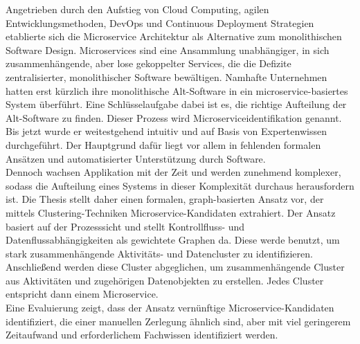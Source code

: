 
\Abstract
Angetrieben durch den Aufstieg von Cloud Computing, agilen Entwicklungsmethoden, DevOps und Continuous Deployment Strategien etablierte sich die Microservice Architektur als Alternative zum monolithischen Software Design. Microservices sind eine Ansammlung unabhängiger, in sich zusammenhängende, aber lose gekoppelter Services, die die Defizite zentralisierter, monolithischer Software bewältigen. Namhafte Unternehmen hatten erst kürzlich ihre monolithische Alt-Software in ein microservice-basiertes System überführt. Eine Schlüsselaufgabe dabei ist es, die richtige Aufteilung der Alt-Software zu finden. Dieser Prozess wird Microserviceidentifikation genannt. Bis jetzt wurde er weitestgehend intuitiv und auf Basis von Expertenwissen durchgeführt. Der Hauptgrund dafür liegt vor allem in fehlenden formalen Ansätzen und automatisierter Unterstützung durch Software.\\
Dennoch wachsen Applikation mit der Zeit und werden zunehmend komplexer, sodass die Aufteilung eines Systems in dieser Komplexität durchaus herausfordern ist. Die Thesis stellt daher einen formalen, graph-basierten Ansatz vor, der mittels Clustering-Techniken Microservice-Kandidaten extrahiert. Der Ansatz basiert auf der Prozesssicht und stellt Kontrollfluss- und Datenflussabhängigkeiten als gewichtete Graphen da. Diese werde benutzt, um stark zusammenhängende Aktivitäts- und Datencluster zu identifizieren. Anschließend werden diese Cluster abgeglichen, um zusammenhängende Cluster aus Aktivitäten und zugehörigen Datenobjekten zu erstellen. Jedes Cluster entspricht dann einem Microservice. \\
Eine Evaluierung zeigt, dass der Ansatz vernünftige Microservice-Kandidaten identifiziert, die einer manuellen Zerlegung ähnlich sind, aber mit viel geringerem Zeitaufwand und erforderlichem Fachwissen identifiziert werden.


